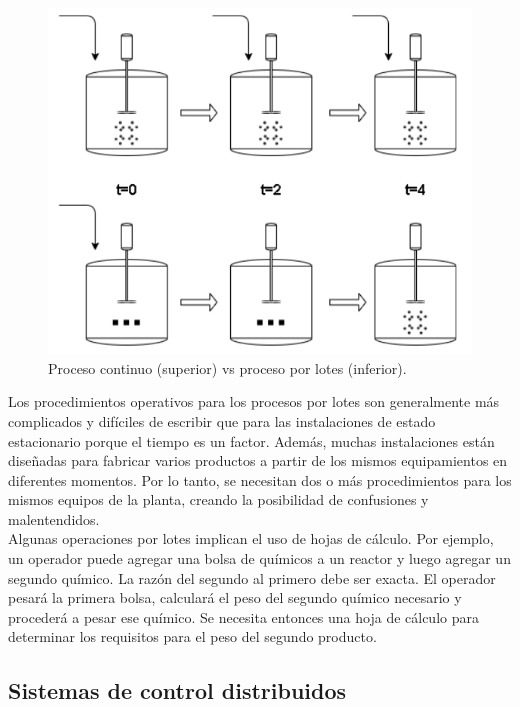 \begin{figure}[htpb]
	\centering
	\includegraphics[scale=.45]{./Figures/tanks.png}
	\caption{Proceso continuo (superior) vs proceso por lotes (inferior).}
	\label{fig:tanks}
\end{figure}

Los procedimientos operativos para los procesos por lotes son generalmente más complicados y difíciles de escribir que para las instalaciones de estado estacionario porque el tiempo es un factor. Además, muchas instalaciones están diseñadas para fabricar varios productos a partir de los mismos equipamientos en diferentes momentos. Por lo tanto, se necesitan dos o más procedimientos para los mismos equipos de la planta, creando la posibilidad de confusiones y malentendidos.\\

Algunas operaciones por lotes implican el uso de hojas de cálculo. Por ejemplo, un operador puede agregar una bolsa de químicos a un reactor y luego agregar un segundo químico. La razón del segundo al primero debe ser exacta. El operador pesará la primera bolsa, calculará el peso del segundo químico necesario y procederá a pesar ese químico. Se necesita entonces una hoja de cálculo para determinar los requisitos para el peso del segundo producto.

\subsection{Sistemas de control distribuidos}

